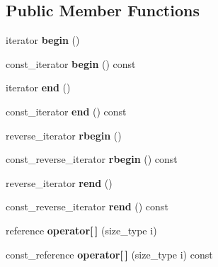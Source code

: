 \subsection*{Public Member Functions}
\begin{DoxyCompactItemize}
\item 
\hypertarget{classSph_1_1CArray_a0871596ee9bde35f4ec59c85dd48736e}{}\label{classSph_1_1CArray_a0871596ee9bde35f4ec59c85dd48736e} 
iterator {\bfseries begin} ()
\item 
\hypertarget{classSph_1_1CArray_a0ead928a520f60017b89380eaca562bb}{}\label{classSph_1_1CArray_a0ead928a520f60017b89380eaca562bb} 
const\+\_\+iterator {\bfseries begin} () const
\item 
\hypertarget{classSph_1_1CArray_a42741661c05c9227a2e490009081cf1b}{}\label{classSph_1_1CArray_a42741661c05c9227a2e490009081cf1b} 
iterator {\bfseries end} ()
\item 
\hypertarget{classSph_1_1CArray_af6ef1db88d86387e389c7335e5ecc1d2}{}\label{classSph_1_1CArray_af6ef1db88d86387e389c7335e5ecc1d2} 
const\+\_\+iterator {\bfseries end} () const
\item 
\hypertarget{classSph_1_1CArray_a73541a8afd667066bc8bf880caba1889}{}\label{classSph_1_1CArray_a73541a8afd667066bc8bf880caba1889} 
reverse\+\_\+iterator {\bfseries rbegin} ()
\item 
\hypertarget{classSph_1_1CArray_aaeebae2e11d397f8089aec75077326b0}{}\label{classSph_1_1CArray_aaeebae2e11d397f8089aec75077326b0} 
const\+\_\+reverse\+\_\+iterator {\bfseries rbegin} () const
\item 
\hypertarget{classSph_1_1CArray_a6d661c5ca64dd063b87986864dc718e1}{}\label{classSph_1_1CArray_a6d661c5ca64dd063b87986864dc718e1} 
reverse\+\_\+iterator {\bfseries rend} ()
\item 
\hypertarget{classSph_1_1CArray_a832b85926d62171376e190c1643eaf8c}{}\label{classSph_1_1CArray_a832b85926d62171376e190c1643eaf8c} 
const\+\_\+reverse\+\_\+iterator {\bfseries rend} () const
\item 
\hypertarget{classSph_1_1CArray_aa5d410bc82aa19c9f4c37f3fa7fbbbdf}{}\label{classSph_1_1CArray_aa5d410bc82aa19c9f4c37f3fa7fbbbdf} 
reference {\bfseries operator\mbox{[}$\,$\mbox{]}} (size\+\_\+type i)
\item 
\hypertarget{classSph_1_1CArray_a7b8dfa8f8ce890e71c568e45b6588c18}{}\label{classSph_1_1CArray_a7b8dfa8f8ce890e71c568e45b6588c18} 
const\+\_\+reference {\bfseries operator\mbox{[}$\,$\mbox{]}} (size\+\_\+type i) const
\item 
\hypertarget{classSph_1_1CArray_af118438a8046480173ea261e6c112aa3}{}\label{classSph_1_1CArray_af118438a8046480173ea261e6c112aa3} 

\end{DoxyCompactItemize}
